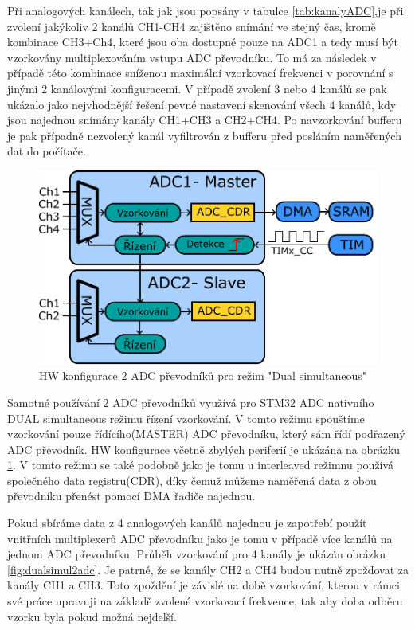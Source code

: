 Při analogových kanálech, tak jak jsou popsány v tabulce \ref{tab:kanalyADC},je při zvolení jakýkoliv 2 kanálů CH1-CH4 zajištěno snímání ve stejný čas, kromě kombinace CH3+Ch4, které jsou oba dostupné pouze na ADC1 a tedy musí být vzorkovány multiplexováním vstupu ADC převodníku. To má za následek v případě této kombinace sníženou maximální vzorkovací frekvenci v porovnání s jinými 2 kanálovými konfiguracemi. V případě zvolení 3 nebo 4 kanálů se pak ukázalo jako nejvhodnější řešení pevné nastavení skenování všech 4 kanálů, kdy jsou najednou snímány kanály CH1+CH3 a CH2+CH4. Po navzorkování bufferu je pak případně nezvolený kanál vyfiltrován z bufferu před posláním naměřených dat do počítače.\\

\begin{figure}[H]
	\centering
	\includegraphics[width=0.6\linewidth]{Figs/Diagrams/SVG/ADC_Dual.pdf}
	\caption{HW konfigurace 2 ADC převodníků pro režim "Dual simultaneous"}
	\label{fig:dualSIMUL}
\end{figure}

Samotné používání 2 ADC převodníků využívá pro STM32 ADC nativního DUAL simultaneous režimu řízení vzorkování. V tomto režimu spouštíme vzorkování pouze řídícího(MASTER) ADC převodníku, který sám řídí podřazený ADC převodník. HW konfigurace včetně zbylých periferií je ukázána na obrázku \ref{fig:dualSIMUL}. V tomto režimu se také podobně jako je tomu u interleaved režimnu používá společného data registru(CDR), díky čemuž můžeme naměřená data z obou převodníku přenést pomocí DMA řadiče najednou.

Pokud sbíráme data z 4 analogových kanálů najednou je zapotřebí použít vnitřních multiplexerů ADC převodníku jako je tomu v případě více kanálů na jednom ADC převodníku. Průběh vzorkování pro 4 kanály je ukázán obrázku \ref{fig:dualsimul2adc}. Je patrné, že se kanály CH2 a CH4 budou nutně zpožďovat za kanály CH1 a CH3. Toto zpoždění je závislé na době vzorkování, kterou v rámci své práce upravuji na základě zvolené vzorkovací frekvence, tak aby doba odběru vzorku byla pokud možná nejdelší. 

